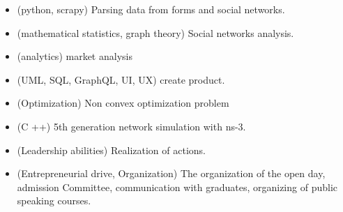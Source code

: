 \documentclass[10pt,a4paper,ragged2e]{altacv}
\begin{document}

\begin{fullwidth}
\makecvheader
\end{fullwidth}




\begin{itemize}
\item (python, scrapy) Parsing data from forms and social networks.
\item (mathematical statistics, graph theory) Social networks analysis.
\item (analytics) market analysis
\item (UML, SQL, GraphQL, UI, UX) create product.  
\end{itemize}

\begin{itemize}
\item (Optimization) Non convex optimization problem
\item (C ++) 5th generation network simulation with ns-3.
\end{itemize}

\begin{itemize}
\item (Leadership abilities) Realization of actions.
\item (Entrepreneurial drive, Organization) The organization of the open day, admission Committee, communication with graduates, organizing of public speaking courses.
\end{itemize}
\end{document}
